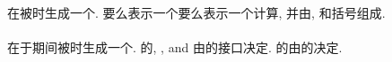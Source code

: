 \paragraph{\Expression{}}

\Expression{}在被\Evaluate{}时生成一个\Data{}\Entity{}. \Expression{}要么表示一个\Data{}\Object{}\Reference{}要么表示一个计算, 并由\Operand{}, \Operator{}和括号组成.

\paragraph{\Function{}\Reference{}}

\Function{}\Reference{}在\Function{}于\Expression{}\Evaluation{}期间被\Execute{}时生成一个\Data{}\Entity{}. \Function{}\Result{}的\Type{}, \TypeParameter{}, and \Rank{}由\Function{}的接口\Interface{}决定. \Function{}\Result{}的\Value{}由\Function{}的\Execution{}决定.
